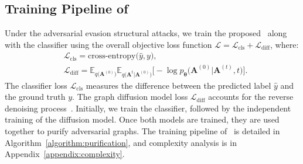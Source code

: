 \subsection{Training Pipeline of \ModelName}
Under the adversarial evasion structural attacks, we train the proposed \ModelName~along with the classifier using the overall objective loss function $\mathcal{L}=\mathcal{L}_{\text{cls}}+\mathcal{L}_{\text{diff}}$, where:
\begin{align}
    &\mathcal{L}_{\text{cls}}=\text{cross-entropy}\big(\hat{y}, y\big),\\
    &\mathcal{L}_{\text{diff}}=\mathbb{E}_{q\big(\mathbf{A}^{(0)}\big)}\mathbb{E}_{q\big(\mathbf{A}^{t}|\mathbf{A}^{(0)}\big)}\big[-\log p_{\boldsymbol{\theta}}\big(\mathbf{A}^{(0)}|\mathbf{A}^{(t)}, t\big)\big].
\end{align}
The classifier loss $\mathcal{L}_{\text{cls}}$ measures the difference between the predicted label $\hat{y}$ and the ground truth $y$. The graph diffusion model loss $\mathcal{L}_{\text{diff}}$ accounts for the reverse denoising process~\cite{austin2021structured}. Initially, we train the classifier, followed by the independent training of the diffusion model. Once both models are trained, they are used together to purify adversarial graphs. The training pipeline of \ModelName~is detailed in Algorithm~\ref{algorithm:purification}, and complexity analysis is in Appendix~\ref{appendix:complexity}. 



